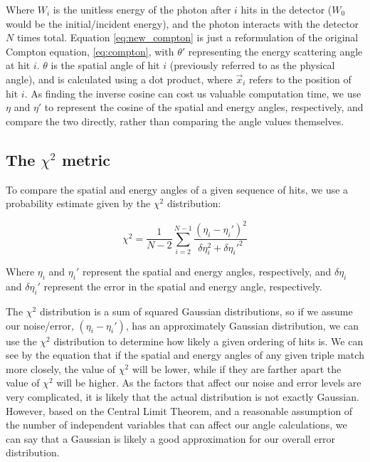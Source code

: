 Where $W_i$ is the unitless energy of the photon after $i$ hits in the detector ($W_0$ would be the initial/incident energy), and the photon interacts with the detector $N$ times total. Equation \ref{eq:new_compton} is just a reformulation of the original Compton equation, \ref{eq:compton}, with $\theta'$ representing the energy scattering angle at hit $i$. $\theta$ is the spatial angle of hit $i$ (previously referred to as the physical angle), and is calculated using a dot product, where $\vec{x}_i$ refers to the position of hit $i$. As finding the inverse cosine can cost us valuable computation time, we use $\eta$ and $\eta'$ to represent the cosine of the spatial and energy angles, respectively, and compare the two directly, rather than comparing the angle values themselves.

\subsection*{The $\chi^2$ metric}
To compare the spatial and energy angles of a given sequence of hits, we use a probability estimate given by the $\chi^2$ distribution:

\begin{equation}
    \label{eq:chi2}\chi^2 = \frac{1}{N-2} \sum_{i=2}^{N-1} \frac{(\eta_i-\eta_i')^2}{\delta\eta_i^2+\delta\eta_i'^2}
\end{equation}

Where $\eta_i$ and $\eta_i'$ represent the spatial and energy angles, respectively, and $\delta\eta_i$ and $\delta\eta_i'$ represent the error in the spatial and energy angle, respectively.

The $\chi^2$ distribution is a sum of squared Gaussian distributions, so if we assume our noise/error, $(\eta_i-\eta_i')$, has an approximately Gaussian distribution, we can use the $\chi^2$ distribution to determine how likely a given ordering of hits is. We can see by the equation that if the spatial and energy angles of any given triple match more closely, the value of $\chi^2$ will be lower, while if they are farther apart the value of $\chi^2$ will be higher. As the factors that affect our noise and error levels are very complicated, it is likely that the actual distribution is not exactly Gaussian. However, based on the Central Limit Theorem, and a reasonable assumption of the number of independent variables that can affect our angle calculations, we can say that a Gaussian is likely a good approximation for our overall error distribution.

